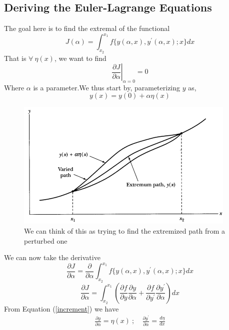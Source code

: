\subsection{Deriving the Euler-Lagrange Equations}
The goal here is to find the extremal of the functional
\begin{equation}
			J(\alpha) = \int_{x_{2}}^{x_{1}}f\{y(\alpha , x),y^{'}(\alpha , x);x \} dx
		\end{equation}
		That is $\forall \ \eta(x)$, we want to find
		\begin{equation}
		\left. \frac{\partial J}{\partial \alpha} \right |_{\alpha = 0}  = 0
		\end{equation}
		Where $\alpha$ is a parameter.We thus start by, parameterizing $y$ as,
		\begin{equation} \label{increment}
		    y(x) = y(0) + \alpha \eta(x)
		\end{equation}
\begin{figure}
	\centering
	\includegraphics[scale=0.8]{Figures/var.png}
	\caption{We can think of this as trying to find the extremized path from a perturbed one}
\end{figure}
	We can now take the derivative
\begin{equation}
\frac{\partial J}{\partial \alpha} = \frac{\partial}{\partial \alpha}\int_{x_{2}}^{x_{1}}f\{y(\alpha , x),y^{'}(\alpha , x);x \} dx
\end{equation}
\begin{equation} \label{eq-varpar}
    \frac{\partial J}{\partial \alpha} = \int_{x_{2}}^{x_{1}} \left(\frac{\partial f}{\partial y}\frac{\partial y}{\partial \alpha} + \frac{\partial f}{\partial y^{'}}\frac{\partial y^{'}}{\partial \alpha} \right) dx
\end{equation}
From Equation (\ref{increment}) we have
\begin{align}
\frac{\partial y}{\partial \alpha} = \eta(x) \ ; \  & \frac{\partial y^{'}}{\partial \alpha} = \frac{d \eta}{d x}
\end{align}
